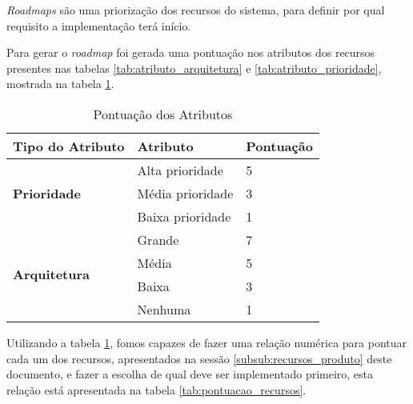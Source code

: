 
\textit{Roadmaps} são uma priorização dos recursos do sistema, para definir por qual requisito a implementação terá início.

Para gerar o \textit{roadmap} foi gerada uma pontuação nos atributos dos recursos presentes nas tabelas \ref{tab:atributo_arquitetura} e \ref{tab:atributo_prioridade}, mostrada na tabela \ref{tab:pontuacao_atributos}.

\begin{table}[H]
\centering
\begin{tabular}{|p{2cm}|p{5cm}|p{3cm}|}

\hline
\textbf{Tipo do Atributo} &
\textbf{Atributo} &
\textbf{Pontuação}
\\ \hline

\multirow{3}{*}{
\textbf{Prioridade}} &
	Alta prioridade &
	5
	\\ \cline{2-3} &
	Média prioridade  &
	3
	\\ \cline{2-3} &
	Baixa prioridade  &
	1
	\\ \hline

\multirow{4}{*}{\textbf{Arquitetura}} &
	Grande &
	7
	\\ \cline{2-3} &
	Média &
	5
	\\ \cline{2-3} &
	Baixa &
	3
	\\ \cline{2-3} &
	Nenhuma &
	1
	\\ \hline
\end{tabular}
\caption{Pontuação dos Atributos}
\label{tab:pontuacao_atributos}
\end{table}

Utilizando a tabela \ref{tab:pontuacao_atributos}, fomos capazes de fazer uma relação numérica para pontuar cada um dos recursos, apresentados na sessão \ref{subsub:recursos_produto} deste documento, e fazer a escolha de qual deve ser implementado primeiro, esta relação está apresentada na tabela \ref{tab:pontuacao_recursos}.

